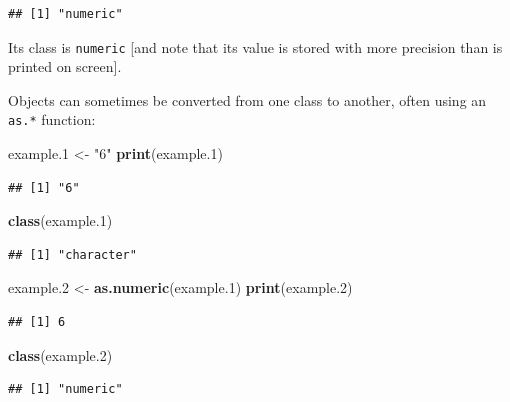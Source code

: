 \documentclass[]{book}
\newenvironment{Shaded}{\begin{snugshade}}{\end{snugshade}}
\newcommand{\KeywordTok}[1]{\textcolor[rgb]{0.13,0.29,0.53}{\textbf{{#1}}}}
\newcommand{\FloatTok}[1]{\textcolor[rgb]{0.00,0.00,0.81}{{#1}}}
\newcommand{\StringTok}[1]{\textcolor[rgb]{0.31,0.60,0.02}{{#1}}}
\newcommand{\NormalTok}[1]{{#1}}
\theoremstyle{definition}
\theoremstyle{definition}
\theoremstyle{remark}
\begin{document}
\begin{verbatim}
## [1] "numeric"
\end{verbatim}

Its class is \texttt{numeric} {[}and note that its value is stored with
more precision than is printed on screen{]}.

Objects can sometimes be converted from one class to another, often
using an \texttt{as.*} function:

\begin{Shaded}
\begin{Highlighting}[]
\NormalTok{example}\FloatTok{.1} \NormalTok{<-}\StringTok{ "6"}
\KeywordTok{print}\NormalTok{(example}\FloatTok{.1}\NormalTok{)}
\end{Highlighting}
\end{Shaded}

\begin{verbatim}
## [1] "6"
\end{verbatim}

\begin{Shaded}
\begin{Highlighting}[]
\KeywordTok{class}\NormalTok{(example}\FloatTok{.1}\NormalTok{)}
\end{Highlighting}
\end{Shaded}

\begin{verbatim}
## [1] "character"
\end{verbatim}

\begin{Shaded}
\begin{Highlighting}[]
\NormalTok{example}\FloatTok{.2} \NormalTok{<-}\StringTok{ }\KeywordTok{as.numeric}\NormalTok{(example}\FloatTok{.1}\NormalTok{)}
\KeywordTok{print}\NormalTok{(example}\FloatTok{.2}\NormalTok{)}
\end{Highlighting}
\end{Shaded}

\begin{verbatim}
## [1] 6
\end{verbatim}

\begin{Shaded}
\begin{Highlighting}[]
\KeywordTok{class}\NormalTok{(example}\FloatTok{.2}\NormalTok{)}
\end{Highlighting}
\end{Shaded}

\begin{verbatim}
## [1] "numeric"
\end{verbatim}
\end{document}
